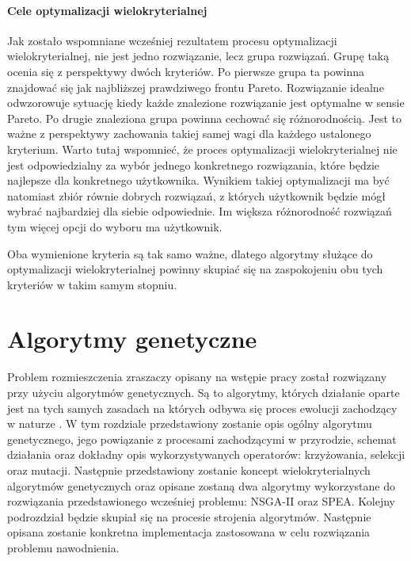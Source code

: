 \documentclass[twoside]{iisthesis}
\begin{document}
\subsubsection{Cele optymalizacji wielokryterialnej}
Jak zostało wspomniane wcześniej rezultatem procesu optymalizacji wielokryterialnej, nie jest jedno rozwiązanie, lecz grupa rozwiązań. Grupę taką ocenia się z perspektywy dwóch kryteriów\cite{book}. Po pierwsze grupa ta powinna znajdować się jak najbliższej prawdziwego frontu Pareto. Rozwiązanie idealne odwzorowuje sytuację kiedy każde znalezione rozwiązanie jest optymalne w sensie Pareto. Po drugie znaleziona grupa powinna cechować się różnorodnością. Jest to ważne z perspektywy zachowania takiej samej wagi dla każdego ustalonego kryterium. Warto tutaj wspomnieć, że proces optymalizacji wielokryterialnej nie jest odpowiedzialny za wybór jednego konkretnego rozwiązania, które będzie najlepsze dla konkretnego użytkownika. Wynikiem takiej optymalizacji ma być natomiast zbiór równie dobrych rozwiązań, z których użytkownik będzie mógł wybrać najbardziej dla siebie odpowiednie. Im większa różnorodność rozwiązań tym więcej opcji do wyboru ma użytkownik.

Oba wymienione kryteria są tak samo ważne, dlatego algorytmy służące do optymalizacji wielokryterialnej powinny skupiać się na zaspokojeniu obu tych kryteriów w takim samym stopniu\cite{book}.

\chapter{Algorytmy genetyczne}
Problem rozmieszczenia zraszaczy opisany na wstępie pracy został rozwiązany przy użyciu algorytmów genetycznych. Są to algorytmy, których działanie oparte jest na tych samych zasadach na których odbywa się proces ewolucji zachodzący w naturze \cite{ga_book}. W tym rozdziale przedstawiony zostanie opis ogólny algorytmu genetycznego, jego powiązanie z procesami zachodzącymi w przyrodzie, schemat działania oraz dokładny opis wykorzystywanych operatorów: krzyżowania, selekcji oraz mutacji. Następnie przedstawiony zostanie koncept wielokryterialnych algorytmów genetycznych oraz opisane zostaną dwa algorytmy wykorzystane do rozwiązania przedstawionego wcześniej problemu: NSGA-II oraz SPEA. Kolejny podrozdział będzie skupiał się na procesie strojenia algorytmów. Następnie opisana zostanie konkretna implementacja zastosowana w celu rozwiązania problemu nawodnienia.
\end{document}
